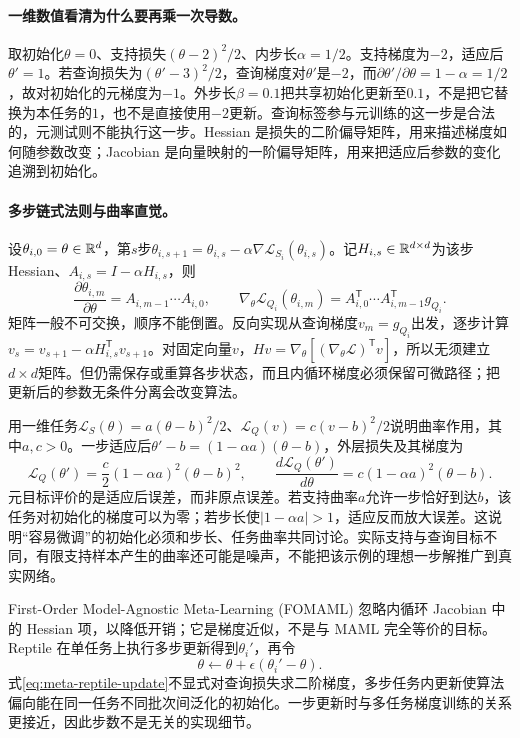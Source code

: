 \paragraph{一维数值看清为什么要再乘一次导数。}
取初始化$\theta=0$、支持损失$(\theta-2)^2/2$、内步长$\alpha=1/2$。支持梯度为$-2$，适应后$\theta'=1$。若查询损失为$(\theta'-3)^2/2$，查询梯度对$\theta'$是$-2$，而$\partial\theta'/\partial\theta=1-\alpha=1/2$，故对初始化的元梯度为$-1$。外步长$\beta=0.1$把共享初始化更新至$0.1$，不是把它替换为本任务的$1$，也不是直接使用$-2$更新。查询标签参与元训练的这一步是合法的，元测试则不能执行这一步。Hessian 是损失的二阶偏导矩阵，用来描述梯度如何随参数改变；Jacobian 是向量映射的一阶偏导矩阵，用来把适应后参数的变化追溯到初始化。

\paragraph{多步链式法则与曲率直觉。}
设$\theta_{i,0}=\theta\in\mathbb{R}^d$，第$s$步$\theta_{i,s+1}=\theta_{i,s}-\alpha\nabla\mathcal L_{S_i}(\theta_{i,s})$。记$H_{i,s}\in\mathbb{R}^{d\times d}$为该步 Hessian、$A_{i,s}=I-\alpha H_{i,s}$，则
\begin{equation}
 \frac{\partial\theta_{i,m}}{\partial\theta}
 =A_{i,m-1}\cdots A_{i,0},\qquad
 \nabla_\theta\mathcal L_{Q_i}(\theta_{i,m})
 =A_{i,0}^{\mathsf T}\cdots A_{i,m-1}^{\mathsf T}g_{Q_i}.
\end{equation}
矩阵一般不可交换，顺序不能倒置。反向实现从查询梯度$v_m=g_{Q_i}$出发，逐步计算$v_s=v_{s+1}-\alpha H_{i,s}^{\mathsf T}v_{s+1}$。对固定向量$v$，$Hv=\nabla_\theta[(\nabla_\theta\mathcal L)^{\mathsf T}v]$，所以无须建立$d\times d$矩阵。但仍需保存或重算各步状态，而且内循环梯度必须保留可微路径；把更新后的参数无条件分离会改变算法。

用一维任务$\mathcal L_S(\theta)=a(\theta-b)^2/2$、$\mathcal L_Q(v)=c(v-b)^2/2$说明曲率作用，其中$a,c>0$。一步适应后$\theta'-b=(1-\alpha a)(\theta-b)$，外层损失及其梯度为
\begin{equation}
 \mathcal L_Q(\theta')=\frac c2(1-\alpha a)^2(\theta-b)^2,
 \qquad \frac{d\mathcal L_Q(\theta')}{d\theta}
 =c(1-\alpha a)^2(\theta-b).
\end{equation}
元目标评价的是适应后误差，而非原点误差。若支持曲率$a$允许一步恰好到达$b$，该任务对初始化的梯度可以为零；若步长使$|1-\alpha a|>1$，适应反而放大误差。这说明“容易微调”的初始化必须和步长、任务曲率共同讨论。实际支持与查询目标不同，有限支持样本产生的曲率还可能是噪声，不能把该示例的理想一步解推广到真实网络。

First-Order Model-Agnostic Meta-Learning (FOMAML) 忽略内循环 Jacobian 中的 Hessian 项，以降低开销；它是梯度近似，不是与 MAML 完全等价的目标。Reptile 在单任务上执行多步更新得到$\theta_i'$，再令\cite{nichol2018reptile}
\begin{equation}
 \theta\leftarrow\theta+\epsilon(\theta_i'-\theta).\label{eq:meta-reptile-update}
\end{equation}
式\eqref{eq:meta-reptile-update}不显式对查询损失求二阶梯度，多步任务内更新使算法偏向能在同一任务不同批次间泛化的初始化。一步更新时与多任务梯度训练的关系更接近，因此步数不是无关的实现细节。


